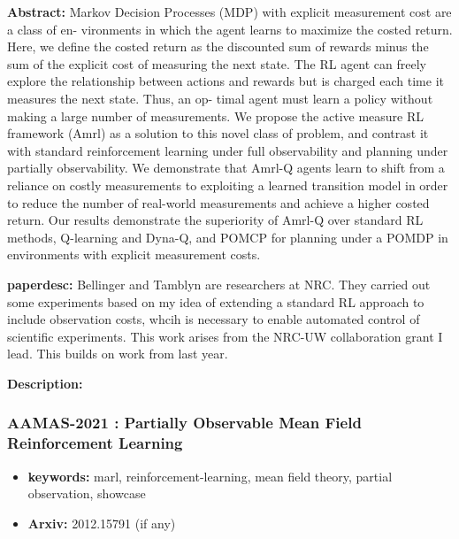\documentclass{article}
\begin{document}

\textbf{Abstract:} Markov Decision Processes (MDP) with explicit measurement cost are a class of en- vironments in which the agent learns to maximize the costed return. Here, we define the costed return as the discounted sum of rewards minus the sum of the explicit cost of measuring the next state. The RL agent can freely explore the relationship between actions and rewards but is charged each time it measures the next state. Thus, an op- timal agent must learn a policy without making a large number of measurements. We propose the active measure RL framework (Amrl) as a solution to this novel class of problem, and contrast it with standard reinforcement learning under full observability and planning under partially observability. We demonstrate that Amrl-Q agents learn to shift from a reliance on costly measurements to exploiting a learned transition model in order to reduce the number of real-world measurements and achieve a higher costed return. Our results demonstrate the superiority of Amrl-Q over standard RL methods, Q-learning and Dyna-Q, and POMCP for planning under a POMDP in environments with explicit measurement costs.

\textbf{paperdesc:} Bellinger and Tamblyn are researchers at NRC. They carried out some experiments based on my idea of extending a standard RL approach to include observation costs, whcih is necessary to enable automated control of scientific experiments. This work arises from the NRC-UW collaboration grant I lead. This builds on work from \cite{bellinger2020reinforcement} last year.

\textbf{Description:} 



\newpage
\subsubsection{\textbf{AAMAS-2021} : Partially Observable Mean Field Reinforcement Learning}
\begin{itemize}
\item \textbf{keywords:} marl, reinforcement-learning, mean field theory, partial observation, showcase
\item \textbf{Arxiv:} 2012.15791 (if any)
\end{itemize}
\end{document}
